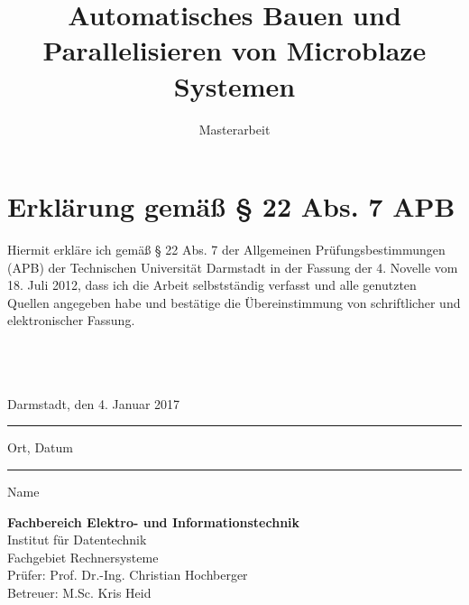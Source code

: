 \documentclass[accentcolor=tud1c,colorback,ngerman,12pt] {tudreport}
\begin{document}
\title{Automatisches Bauen und Parallelisieren von Microblaze Systemen}
\subtitle{Masterarbeit}

\maketitle
\chapter*{Erklärung gemäß § 22 Abs. 7 APB}

Hiermit erkläre ich gemäß § 22 Abs. 7 der Allgemeinen Prüfungsbestimmungen (APB) der Technischen Universität Darmstadt in der Fassung der 4. Novelle vom 18. Juli 2012, dass ich die Arbeit selbstständig verfasst und alle genutzten Quellen angegeben habe und bestätige die Übereinstimmung von schriftlicher und elektronischer Fassung.\\ \\ \\ \\

\parbox{8cm}{\centering Darmstadt, den 4. Januar 2017\hrule
\strut \centering\footnotesize Ort, Datum} \hfill\parbox{8cm}{\phantom{Darmstadt, den 4. Januar 2017} \hrule
\strut \centering\footnotesize Name}

\vfill

\noindent \textbf{Fachbereich Elektro- und Informationstechnik}\\
Institut für Datentechnik\\
Fachgebiet Rechnersysteme\\
Prüfer: Prof. Dr.-Ing. Christian Hochberger\\
Betreuer: M.Sc. Kris Heid

\tableofcontents







\end{document}
